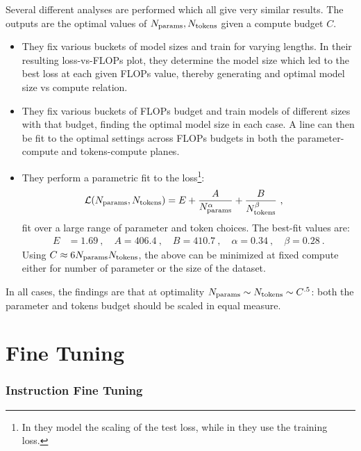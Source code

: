 \documentclass[11pt]{article}
\begin{document}
Several different analyses are performed which all give very similar results. The outputs are the optimal values of $ N _{ {\rm params} }, N _{ {\rm tokens} } $ given a compute budget $ C $.
\begin{itemize}
	\item They fix various buckets of model sizes and train for varying lengths. In their resulting
	      loss-vs-FLOPs plot, they determine the model size which led to the best loss at each given FLOPs value, thereby generating
	      and optimal model size vs compute relation.
	\item They fix various buckets of FLOPs budget and train models of different sizes with that budget,
	      finding the optimal model size in each case. A line can then be fit to the optimal settings across
	      FLOPs budgets in both the parameter-compute and tokens-compute planes.
	\item  They perform a parametric fit to the loss\footnote{In \cite{hoffmann2022training} they model
		      the scaling of the test loss, while in \cite{kaplan2020scaling} they use the training loss.}:
	      \begin{align}
		      \mathcal{L} (N _{ {\rm params} }, N _{ {\rm tokens} }) & =E + \frac{ A }{ N _{ {\rm  params} } ^{ \alpha  } }  + \frac{ B }{ N _{ {\rm tokens} } ^{ \beta  } } \label{eq_chinchilla} \ ,
	      \end{align}
	      fit over a large range of parameter and token choices. The best-fit values are:
	      \begin{align}
		      E & = 1.69 \ , \quad A = 406.4 \ , \quad B = 410.7 \ , \quad  \alpha = 0.34 \ , \quad \beta =0.28 \ .
	      \end{align}
	      Using $ C \approx 6 N _{ {\rm params}} N _{ {\rm tokens} } $, the above can be minimized at fixed compute
	      either for number of parameter or the size of the dataset.
\end{itemize}
In all cases, the findings are that at optimality  $ N _{ {\rm params} }  \sim N _{ {\rm tokens}
		}\sim C ^{ .5 } $: both the parameter and tokens budget should be scaled in equal measure.


\newpage
\part{Fine Tuning}

\section{Instruction Fine Tuning}
\end{document}
